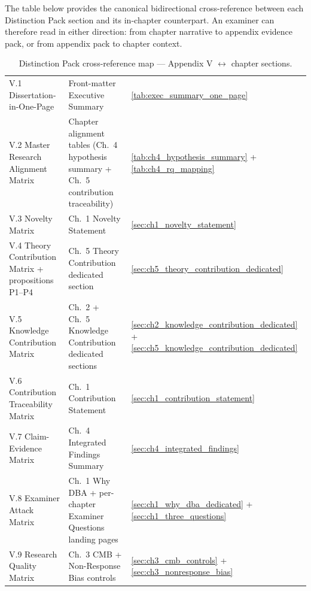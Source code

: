 \noindent The table below provides the canonical bidirectional cross-reference between each Distinction Pack section and its in-chapter counterpart. An examiner can therefore read in either direction: from chapter narrative to appendix evidence pack, or from appendix pack to chapter context.

{\tablestripes\tablefontsize
{}
\begin{xltabular}{\textwidth}{@{} >{\raggedright\arraybackslash}p{4.0cm} >{\raggedright\arraybackslash}p{4.5cm} L @{}}
\caption[Distinction Pack cross-reference map]{Distinction Pack cross-reference map --- Appendix V $\leftrightarrow$ chapter sections.}\label{tab:dist_crossref_map} \\
\toprule
{} &  &  \\
\midrule
\endfirsthead
\endhead
\bottomrule
\endlastfoot
V.1 Dissertation-in-One-Page & Front-matter Executive Summary & \autoref{tab:exec_summary_one_page} \\
\addlinespace
V.2 Master Research Alignment Matrix & Chapter alignment tables (Ch.~4 hypothesis summary + Ch.~5 contribution traceability) & \autoref{tab:ch4_hypothesis_summary} + \autoref{tab:ch4_rq_mapping} \\
\addlinespace
V.3 Novelty Matrix & Ch.~1 Novelty Statement & \autoref{sec:ch1_novelty_statement} \\
\addlinespace
V.4 Theory Contribution Matrix + propositions P1--P4 & Ch.~5 Theory Contribution dedicated section & \autoref{sec:ch5_theory_contribution_dedicated} \\
\addlinespace
V.5 Knowledge Contribution Matrix & Ch.~2 + Ch.~5 Knowledge Contribution dedicated sections & \autoref{sec:ch2_knowledge_contribution_dedicated} + \autoref{sec:ch5_knowledge_contribution_dedicated} \\
\addlinespace
V.6 Contribution Traceability Matrix & Ch.~1 Contribution Statement & \autoref{sec:ch1_contribution_statement} \\
\addlinespace
V.7 Claim-Evidence Matrix & Ch.~4 Integrated Findings Summary & \autoref{sec:ch4_integrated_findings} \\
\addlinespace
V.8 Examiner Attack Matrix & Ch.~1 Why DBA + per-chapter Examiner Questions landing pages & \autoref{sec:ch1_why_dba_dedicated} + \autoref{sec:ch1_three_questions} \\
\addlinespace
V.9 Research Quality Matrix & Ch.~3 CMB + Non-Response Bias controls & \autoref{sec:ch3_cmb_controls} + \autoref{sec:ch3_nonresponse_bias} \\

\end{xltabular}}
